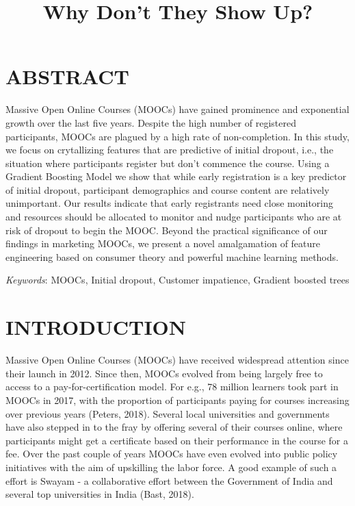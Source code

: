 \documentclass[12pt,]{article}
\title{Why Don't They Show Up?}
\author{}
\date{}
\begin{document}
\maketitle

\section{ABSTRACT}\label{abstract}

Massive Open Online Courses (MOOCs) have gained prominence and
exponential growth over the last five years. Despite the high number of
registered participants, MOOCs are plagued by a high rate of
non-completion. In this study, we focus on crytallizing features that
are predictive of initial dropout, i.e., the situation where
participants register but don't commence the course. Using a Gradient
Boosting Model we show that while early registration is a key predictor
of initial dropout, participant demographics and course content are
relatively unimportant. Our results indicate that early registrants need
close monitoring and resources should be allocated to monitor and nudge
participants who are at risk of dropout to begin the MOOC. Beyond the
practical significance of our findings in marketing MOOCs, we present a
novel amalgamation of feature engineering based on consumer theory and
powerful machine learning methods.

\emph{Keywords}: MOOCs, Initial dropout, Customer impatience, Gradient
boosted trees

\newpage

\section{INTRODUCTION}\label{introduction}

Massive Open Online Courses (MOOCs) have received widespread attention
since their launch in 2012. Since then, MOOCs evolved from being largely
free to access to a pay-for-certification model. For e.g., 78 million
learners took part in MOOCs in 2017, with the proportion of participants
paying for courses increasing over previous years (Peters, 2018).
Several local universities and governments have also stepped in to the
fray by offering several of their courses online, where participants
might get a certificate based on their performance in the course for a
fee. Over the past couple of years MOOCs have even evolved into public
policy initiatives with the aim of upskilling the labor force. A good
example of such a effort is Swayam - a collaborative effort between the
Government of India and several top universities in India (Bast, 2018).
\end{document}
